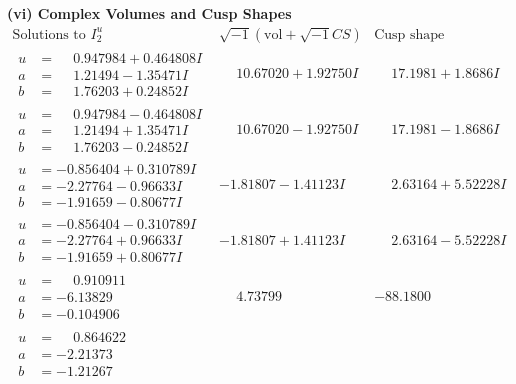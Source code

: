 \documentclass[1p]{elsarticle_modified}
\theoremstyle{definition}
\newcommand{\I}{\sqrt{-1}}
\begin{document}
\newpage\flushleft \textbf{(vi) Complex Volumes and Cusp Shapes}
$$\begin{array}{c|c|c}  
\text{Solutions to }I^u_{2}& \I (\text{vol} + \sqrt{-1}CS) & \text{Cusp shape}\\
 \hline 
\begin{aligned}
u &= \phantom{-}0.947984 + 0.464808 I \\
a &= \phantom{-}1.21494 - 1.35471 I \\
b &= \phantom{-}1.76203 + 0.24852 I\end{aligned}
 & \phantom{-}10.67020 + 1.92750 I & \phantom{-}17.1981 + 1.8686 I \\ \hline\begin{aligned}
u &= \phantom{-}0.947984 - 0.464808 I \\
a &= \phantom{-}1.21494 + 1.35471 I \\
b &= \phantom{-}1.76203 - 0.24852 I\end{aligned}
 & \phantom{-}10.67020 - 1.92750 I & \phantom{-}17.1981 - 1.8686 I \\ \hline\begin{aligned}
u &= -0.856404 + 0.310789 I \\
a &= -2.27764 - 0.96633 I \\
b &= -1.91659 - 0.80677 I\end{aligned}
 & -1.81807 - 1.41123 I & \phantom{-}2.63164 + 5.52228 I \\ \hline\begin{aligned}
u &= -0.856404 - 0.310789 I \\
a &= -2.27764 + 0.96633 I \\
b &= -1.91659 + 0.80677 I\end{aligned}
 & -1.81807 + 1.41123 I & \phantom{-}2.63164 - 5.52228 I \\ \hline\begin{aligned}
u &= \phantom{-}0.910911\phantom{ +0.000000I} \\
a &= -6.13829\phantom{ +0.000000I} \\
b &= -0.104906\phantom{ +0.000000I}\end{aligned}
 & \phantom{-}4.73799\phantom{ +0.000000I} & -88.1800\phantom{ +0.000000I} \\ \hline\begin{aligned}
u &= \phantom{-}0.864622\phantom{ +0.000000I} \\
a &= -2.21373\phantom{ +0.000000I} \\
b &= -1.21267\phantom{ +0.000000I}\end{aligned}

\end{array}$$
\end{document}
